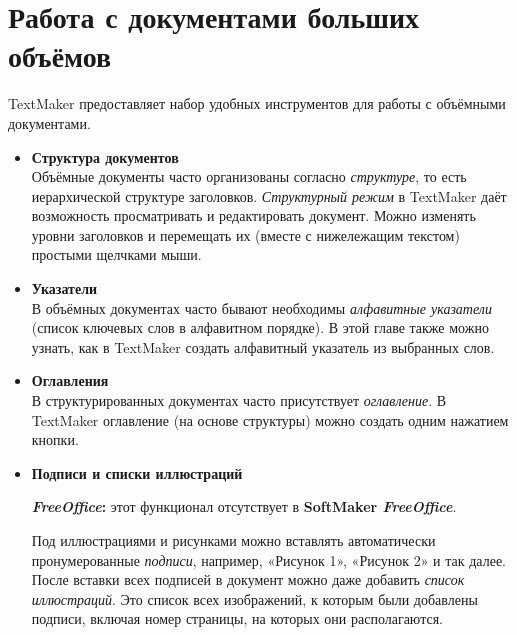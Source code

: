 ﻿\documentclass[a4paper,10pt]{article}
\begin{document}
\section{Работа с документами больших объёмов} \label{sec:рабдокболшобъёмов}
TextMaker предоставляет набор удобных инструментов для работы с объёмными документами.

\begin{itemize}
 \item \textbf{Структура документов}\\
 Объёмные документы часто организованы согласно \textit{структуре}, то есть иерархической структуре заголовков. \textit{Структурный режим} в TextMaker даёт возможность просматривать и редактировать документ. Можно изменять уровни заголовков и перемещать их (вместе с нижележащим текстом) простыми щелчками мыши.
 \item \textbf{Указатели}\\
 В объёмных документах часто бывают необходимы \textit{алфавитные указатели} (список ключевых слов в алфавитном порядке). В этой главе также можно узнать, как в TextMaker создать алфавитный указатель из выбранных слов.
 \item \textbf{Оглавления}\\
 В структурированных документах часто присутствует \textit{оглавление}. В TextMaker оглавление (на основе структуры) можно создать одним нажатием кнопки.
 \item \textbf{Подписи и списки иллюстраций}\\
 \begin{mdframed}[backgroundcolor=pink!50]
\textbf{\textit{FreeOffice}:} этот функционал отсутствует в \textbf{SoftMaker \textit{FreeOffice}}.
\end{mdframed}
Под иллюстрациями и рисунками можно вставлять автоматически пронумерованные \textit{подписи}, например, «Рисунок 1», «Рисунок 2» и так далее. После вставки всех подписей в документ можно даже добавить \textit{список иллюстраций}. Это список всех изображений, к которым были добавлены подписи, включая номер страницы, на которых они располагаются.


\end{itemize}
\end{document}
